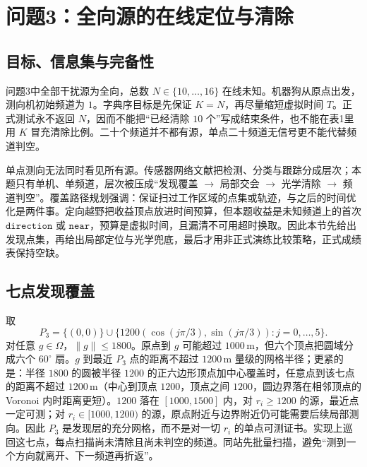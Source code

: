 \section{问题3：全向源的在线定位与清除}

\subsection{目标、信息集与完备性}

问题3中全部干扰源为全向，总数 $N\in\{10,\ldots,16\}$ 在线未知。机器狗从原点出发，测向机初始频道为 $1$。字典序目标是先保证 $K=N$，再尽量缩短虚拟时间 $T$。正式测试永不返回 $N$，因而不能把“已经清除 $10$ 个”写成结束条件，也不能在表1里用 $K$ 冒充清除比例。二十个频道并不都有源，单点二十频道无信号更不能代替频道判空。

单点测向无法同时看见所有源。传感器网络文献把检测、分类与跟踪分成层次；本题只有单机、单频道，层次被压成“发现覆盖 $\to$ 局部交会 $\to$ 光学清除 $\to$ 频道判空”。覆盖路径规划强调：保证扫过工作区域的点集或轨迹，与之后的时间优化是两件事。定向越野把收益顶点放进时间预算，但本题收益是未知频道上的首次 $\mathtt{direction}$ 或 $\mathtt{near}$，预算是虚拟时间，且漏清不可用超时换取。因此本节先给出发现点集，再给出局部定位与光学兜底，最后才用非正式演练比较策略，正式成绩表保持空缺。

\subsection{七点发现覆盖}

取
\begin{equation}
P_3=\bigl\{(0,0)\bigr\}\cup\bigl\{1200(\cos(j\pi/3),\sin(j\pi/3)):j=0,\ldots,5\bigr\}.
\end{equation}
对任意 $g\in\Omega$，$\|g\|\le 1800$。原点到 $g$ 可能超过 $1000\,\mathrm{m}$，但六个顶点把圆域分成六个 $60^\circ$ 扇。$g$ 到最近 $P_3$ 点的距离不超过 $1200\,\mathrm{m}$ 量级的网格半径；更紧的是：半径 $1800$ 的圆被半径 $1200$ 的正六边形顶点加中心覆盖时，任意点到该七点的距离不超过 $1200\,\mathrm{m}$（中心到顶点 $1200$，顶点之间 $1200$，圆边界落在相邻顶点的 Voronoi 内时距离更短）。$1200$ 落在 $[1000,1500]$ 内，对 $r_i\ge 1200$ 的源，最近点一定可测；对 $r_i\in[1000,1200)$ 的源，原点附近与边界附近仍可能需要后续局部测向。因此 $P_3$ 是发现层的充分网格，而不是对一切 $r_i$ 的单点可测证书。实现上巡回这七点，每点扫描尚未清除且尚未判空的频道。同站先批量扫描，避免“测到一个方向就离开、下一频道再折返”。

